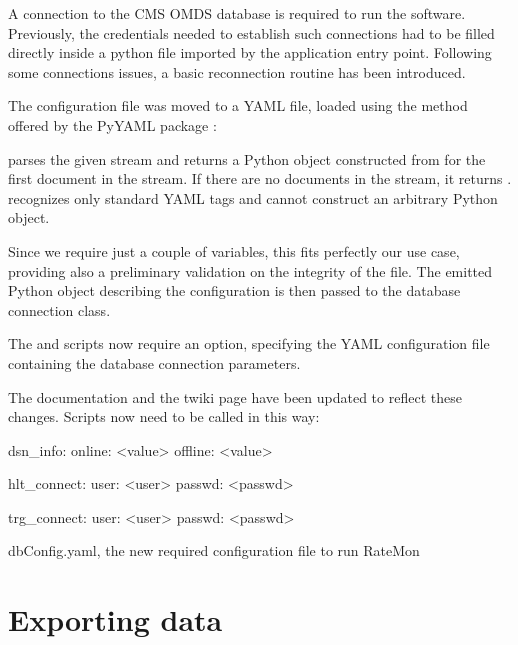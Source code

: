 A connection to the CMS OMDS database is required to run the software. Previously, the credentials needed to establish such connections had to be filled directly inside a python file imported by the application entry point. Following some connections issues, a basic reconnection routine has been introduced.

The configuration file was moved to a YAML file, loaded using the  method offered by the PyYAML package \cite{pyyaml-2020-06-18}:

 parses the given stream and returns a Python object constructed from for the first document in the stream. If there are no documents in the stream, it returns .  recognizes only standard YAML tags and cannot construct an arbitrary Python object.

Since we require just a couple of variables, this fits perfectly our use case, providing also a preliminary validation on the integrity of the file. The emitted Python object describing the configuration is then passed to the database connection class.

The  and  scripts now require an  option, specifying the YAML configuration file containing the database connection parameters.

The documentation and the twiki page have been updated to reflect these changes. Scripts now need to be called in this way:


\begin{listing}[ht]
\begin{yamlcode}
dsn_info:
    online: <value>
    offline: <value>

hlt_connect:
    user: <user>
    passwd: <passwd>

trg_connect:
    user: <user>
    passwd: <passwd>
\end{yamlcode}
\caption{dbConfig.yaml, the new required configuration file to run RateMon}
\end{listing}

\section{Exporting data}

